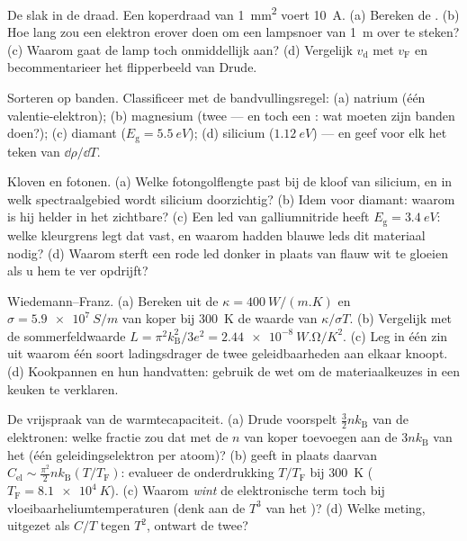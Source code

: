 \begin{exercise}[$\star$]\label{exo:b3:electrons-in-solids:2}
De slak in de draad. Een koperdraad van \qty{1}{mm^2} voert
\qty{10}{A}. (a) Bereken de . (b) Hoe lang zou
een elektron erover doen om een lampsnoer van \qty{1}{m} over te steken? (c) Waarom gaat
de lamp toch onmiddellijk aan? (d) Vergelijk
$v_{\text{d}}$ met $v_{\text{F}}$ en becommentarieer het
flipperbeeld van Drude.
\end{exercise}

\begin{exercise}[$\star$]\label{exo:b3:electrons-in-solids:3}
Sorteren op banden. Classificeer met de bandvullingsregel: (a)
natrium (één valentie-elektron); (b) magnesium (twee --- en toch een
: wat moeten zijn banden doen?); (c) diamant
($E_{\text{g}} = \qty{5.5}{eV}$); (d) silicium
($\qty{1.12}{eV}$) --- en geef voor elk het teken van
$\dd\rho/\dd T$.
\end{exercise}

\begin{exercise}[$\star$]\label{exo:b3:electrons-in-solids:4}
Kloven en fotonen. (a) Welke fotongolflengte past bij de kloof van
silicium, en in welk spectraalgebied wordt silicium
doorzichtig? (b) Idem voor diamant: waarom is hij helder in het
zichtbare? (c) Een led van galliumnitride heeft $E_{\text{g}} =
\qty{3.4}{eV}$: welke kleurgrens legt dat vast, en waarom hadden blauwe
leds dit materiaal nodig? (d) Waarom sterft een rode led donker in plaats van
flauw wit te gloeien als u hem te ver opdrijft?
\end{exercise}

\begin{exercise}[$\star\star$]\label{exo:b3:electrons-in-solids:5}
Wiedemann--Franz. (a) Bereken uit de $\kappa =
\qty{400}{W/(m.K)}$ en $\sigma = \qty{5.9e7}{S/m}$ van koper bij
\qty{300}{K} de waarde van $\kappa/\sigma T$. (b) Vergelijk met de
sommerfeldwaarde $L = \pi^2k_{\text{B}}^2/3e^2 =
\qty{2.44e-8}{W.\ohm/K^2}$. (c) Leg in één zin uit waarom één
soort ladingsdrager de twee geleidbaarheden aan elkaar knoopt. (d) Kookpannen
en hun handvatten: gebruik de wet om de materiaalkeuzes in een keuken
te verklaren.
\end{exercise}

\begin{exercise}[$\star\star$]\label{exo:b3:electrons-in-solids:6}
De vrijspraak van de warmtecapaciteit. (a) Drude voorspelt
$\tfrac32nk_{\text{B}}$ van de elektronen: welke fractie zou dat met de $n$ van
koper toevoegen aan de $3nk_{\text{B}}$ van het 
(één geleidingselektron per atoom)? (b)
 geeft in plaats daarvan $C_{\text{el}}
\sim \tfrac{\pi^2}{2}nk_{\text{B}}(T/T_{\text{F}})$: evalueer de
onderdrukking $T/T_{\text{F}}$ bij \qty{300}{K}
($T_{\text{F}} = \qty{8.1e4}{K}$). (c) Waarom \emph{wint} de elektronische
term toch bij vloeibaarheliumtemperaturen
(denk aan de $T^3$ van het )? (d) Welke meting, uitgezet als
$C/T$ tegen $T^2$, ontwart de twee?
\end{exercise}

